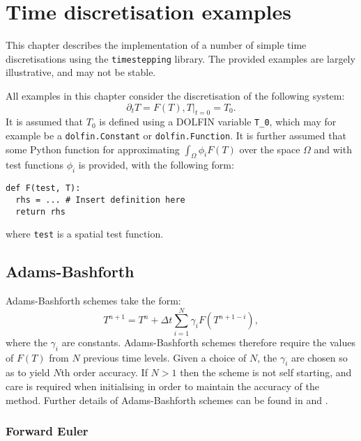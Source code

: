 \documentclass[a4paper]{book}
\begin{document}
\chapter{Time discretisation examples}

This chapter describes the implementation of a number of simple time
discretisations using the \verb+timestepping+ library. The provided examples are
largely illustrative, and may not be stable.

All examples in this chapter consider
the discretisation of the following system:
\begin{subequations}
  \begin{equation}\label{eqn:t_timestep}
    \partial_t T = F(T),
  \end{equation}
  \begin{equation}\label{eqn:t_init}
    \left. T \right|_{t = 0} = T_0.
  \end{equation}
\end{subequations}
It is assumed that $T_0$ is defined using a DOLFIN variable \verb+T_0+, which
may for example be a \verb+dolfin.Constant+ or \verb+dolfin.Function+. It is
further assumed that some Python function for approximating
$\int_\Omega \phi_i F(T)$ over the space $\Omega$ and with test functions
$\phi_i$ is provided, with the following form:
\begin{lstlisting}
def F(test, T):
  rhs = ... # Insert definition here
  return rhs
\end{lstlisting}
where \verb+test+ is a spatial test function.

\section{Adams-Bashforth}

Adams-Bashforth schemes take the form:
\begin{equation}
  T^{n + 1} = T^n + \Delta t \sum_{i = 1}^N \gamma_i F( T^{n + 1 - i}),
\end{equation}
where the $\gamma_i$ are constants. Adams-Bashforth schemes therefore require
the values of $F(T)$ from $N$ previous time levels. Given a choice of $N$, the
$\gamma_i$ are chosen so as to yield $N$th order accuracy. If $N > 1$ then the
scheme is not self starting, and care is required when initialising in order to
maintain the accuracy of the method. Further details of Adams-Bashforth schemes
can be found in \citet[section 2.1]{iserles2009} and
\citet[section III.1]{hairer1987}.

\subsection{Forward Euler}\label{sect:fe}
\end{document}
